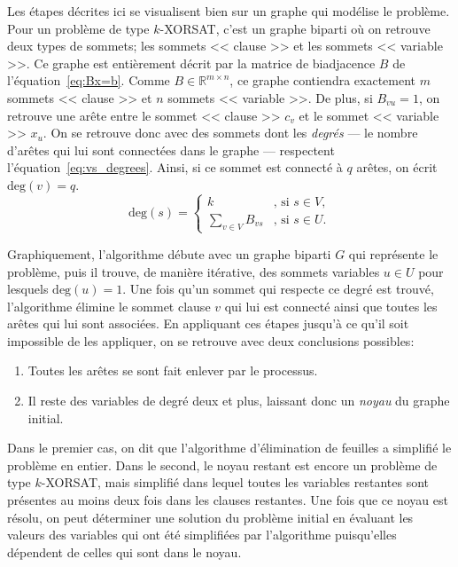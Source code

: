 Les étapes décrites ici se visualisent bien sur un graphe qui modélise le problème.
Pour un problème de type $k$-XORSAT, c'est un graphe biparti où on retrouve deux types de sommets; les sommets << clause >> et les sommets << variable >>.
Ce graphe est entièrement décrit par la matrice de biadjacence $B$ de l'équation~\ref{eq:Bx=b}.
Comme $B \in \mathbb{R}^{m \times n}$, ce graphe contiendra exactement $m$ sommets << clause >> et $n$ sommets << variable >>.
De plus, si $B_{vu} = 1$, on retrouve une arête entre le sommet << clause >> $c_v$ et le sommet << variable >> $x_u$.
On se retrouve donc avec des sommets dont les \emph{degrés} --- le nombre d'arêtes qui lui sont connectées dans le graphe --- respectent l'équation~\ref{eq:vs_degrees}.
Ainsi, si ce sommet est connecté à $q$ arêtes, on écrit $\mathrm{deg}(v) = q$.
\begin{equation}\label{eq:vs_degrees}
    \mathrm{deg}(s) = \begin{cases}
        k & \text{, si } s \in V,\\
        \sum_{v \in V}B_{vs} & \text{, si } s \in U.
    \end{cases}
\end{equation}

Graphiquement, l'algorithme débute avec un graphe biparti $G$ qui représente le problème, puis il trouve, de manière itérative, des sommets variables $u \in U$ pour lesquels $\mathrm{deg}(u) = 1$.
Une fois qu'un sommet qui respecte ce degré est trouvé, l'algorithme élimine le sommet clause $v$ qui lui est connecté ainsi que toutes les arêtes qui lui sont associées.
En appliquant ces étapes jusqu'à ce qu'il soit impossible de les appliquer, on se retrouve avec deux conclusions possibles:
\begin{enumerate}
    \item Toutes les arêtes se sont fait enlever par le processus.
    \item Il reste des variables de degré deux et plus, laissant donc un \emph{noyau} du graphe initial.
\end{enumerate}
Dans le premier cas, on dit que l'algorithme d'élimination de feuilles a simplifié le problème en entier.
Dans le second, le noyau restant est encore un problème de type $k$-XORSAT, mais simplifié dans lequel toutes les variables restantes sont présentes au moins deux fois dans les clauses restantes.
Une fois que ce noyau est résolu, on peut déterminer une solution du problème initial en évaluant les valeurs des variables qui ont été simplifiées par l'algorithme puisqu'elles dépendent de celles qui sont dans le noyau. 

